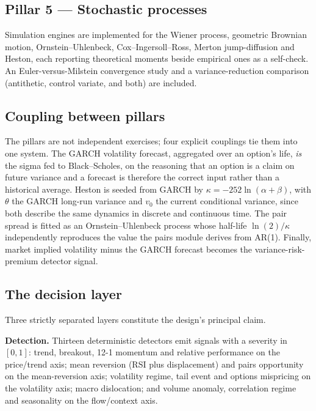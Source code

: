 \documentclass[11pt,a4paper]{article}
\begin{document}
\subsection{Pillar 5 --- Stochastic processes}

Simulation engines are implemented for the Wiener process, geometric Brownian motion,
Ornstein--Uhlenbeck, Cox--Ingersoll--Ross, Merton jump-diffusion and Heston, each reporting
theoretical moments beside empirical ones as a self-check. An Euler-versus-Milstein
convergence study and a variance-reduction comparison (antithetic, control variate, and
both) are included.

\subsection{Coupling between pillars}

The pillars are not independent exercises; four explicit couplings tie them into one
system. The GARCH volatility forecast, aggregated over an option's life, \emph{is} the
sigma fed to Black--Scholes, on the reasoning that an option is a claim on future variance
and a forecast is therefore the correct input rather than a historical average. Heston is
seeded from GARCH by $\kappa = -252\ln(\alpha+\beta)$, with $\theta$ the GARCH long-run
variance and $v_0$ the current conditional variance, since both describe the same dynamics
in discrete and continuous time. The pair spread is fitted as an Ornstein--Uhlenbeck
process whose half-life $\ln(2)/\kappa$ independently reproduces the value the pairs module
derives from AR(1). Finally, market implied volatility minus the GARCH forecast becomes the
variance-risk-premium detector signal.

\subsection{The decision layer}

Three strictly separated layers constitute the design's principal claim.

\textbf{Detection.} Thirteen deterministic detectors emit signals with a severity in
$[0,1]$: trend, breakout, 12-1 momentum and relative performance on the price/trend axis;
mean reversion (RSI plus displacement) and pairs opportunity on the mean-reversion axis;
volatility regime, tail event and options mispricing on the volatility axis; macro
dislocation; and volume anomaly, correlation regime and seasonality on the flow/context
axis.
\end{document}
